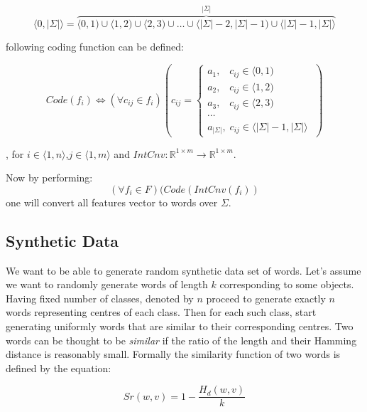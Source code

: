 \documentclass{mini}
\begin{document}
\[
\langle 0 , |\Sigma| \rangle = \overbrace{\langle 0 , 1) \cup \langle 1 , 2 ) \cup \langle 2 , 3 ) \cup \ldots \cup \langle |\Sigma| -2 , |\Sigma| -1 ) \cup \langle |\Sigma| -1, |\Sigma|  \rangle}^{|\Sigma|}
\] 

following coding function can be defined:

\begin{equation}
    Code(f_i) \Leftrightarrow (\forall{c_{ij} \in f_i})(c_{ij} = 
    \begin{cases}
        a_1 , \;\;\; c_{ij} \in  \langle 0 , 1)  \\
        a_2 , \;\;\; c_{ij} \in  \langle 1 , 2 ) \\
        a_3 , \;\;\; c_{ij} \in  \langle 2 , 3 )\\
        \cdots \\
        a_{|\Sigma|} , \; c_{ij} \in \langle |\Sigma| -1, |\Sigma|  \rangle\; 
    \end{cases})
\end{equation}

, for $i \in \langle 1, n \rangle$,$j \in \langle 1, m \rangle$ and $IntCnv : \mathbb{R}^{1 \times m} \rightarrow \mathbb{R}^{1 \times m}$. 

Now by performing:
\begin{equation}
    (\forall{f_i \in F})(Code(IntCnv(f_i))
\end{equation}
one will convert all features vector to words over $\Sigma$.

\subsection{Synthetic Data} \label{section:word_gen_synth}
We want to be able to generate random synthetic data set of words. 
Let's assume we want to randomly generate words of length $k$ corresponding to some objects. Having fixed number of classes, denoted by $n$ proceed to generate exactly $n$ words representing centres of each class. Then for each such class, start generating uniformly words that are similar to their corresponding centres. Two words can be thought to be \textit{similar} if the ratio of the length and their Hamming distance is reasonably small. Formally the similarity function of two words is defined by the equation:

\begin{equation}
    Sr(w,v) = 1 - \frac{H_d(w,v)}{k}
\end{equation}
\end{document}

